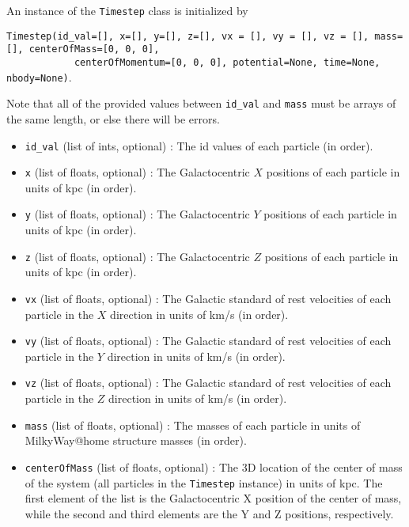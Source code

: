 \documentclass{article}
\begin{document}
An instance of the \verb!Timestep! class is initialized by 

\verb!Timestep(id_val=[], x=[], y=[], z=[], vx = [], vy = [], vz = [], mass=[], centerOfMass=[0, 0, 0],! \\ \verb!            centerOfMomentum=[0, 0, 0], potential=None, time=None, nbody=None)!.

Note that all of the provided values between \verb!id_val! and \verb!mass! must be arrays of the same length, or else there will be errors. 

\begin{itemize}

\item \verb!id_val! (list of ints, optional) : The id values of each particle (in order).

\item \verb!x! (list of floats, optional) : The Galactocentric $X$ positions of each particle in units of kpc (in order).

\item \verb!y! (list of floats, optional) : The Galactocentric $Y$ positions of each particle in units of kpc (in order).

\item \verb!z! (list of floats, optional) : The Galactocentric $Z$ positions of each particle in units of kpc (in order).

\item \verb!vx! (list of floats, optional) : The Galactic standard of rest velocities of each particle in the $X$ direction in units of km/s (in order).

\item \verb!vy! (list of floats, optional) : The Galactic standard of rest velocities of each particle in the $Y$ direction in units of km/s (in order).

\item \verb!vz! (list of floats, optional) : The Galactic standard of rest velocities of each particle in the $Z$ direction in units of km/s (in order).

\item \verb!mass! (list of floats, optional) : The masses of each particle in units of MilkyWay@home structure masses (in order).

\item \verb!centerOfMass! (list of floats, optional) : The 3D location of the center of mass of the system (all particles in the \verb!Timestep! instance) in units of kpc. The first element of the list is the Galactocentric X position of the center of mass, while the second and third elements are the Y and Z positions, respectively.


\end{itemize}
\end{document}
